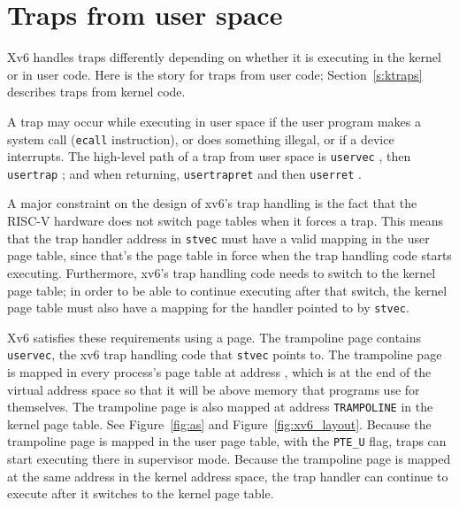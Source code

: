 \section{Traps from user space}

Xv6 handles traps differently depending on whether
it is executing in the kernel or in user code. Here is the
story for traps from user code; Section~\ref{s:ktraps}
describes traps from kernel code.

A trap may occur while executing in user space if the
user program makes a
system call ({\tt ecall} instruction), or does something
illegal, or if a device interrupts.
The high-level path of a trap from user space is
{\tt uservec}
,
then {\tt usertrap}
;
and when returning,
{\tt usertrapret}
and then
{\tt userret}
.


A major constraint on the design of xv6's trap handling is the fact
that the RISC-V hardware does not switch page tables when it forces a
trap. This means that the trap handler
address in {\tt stvec} must have a valid
mapping in the user page table, since that's the page table in force
when the trap handling code starts executing. Furthermore, xv6's trap
handling code needs to switch to the kernel page table; in order to be
able to continue executing after that switch, the kernel page table
must also have a mapping for the handler pointed to by {\tt stvec}.

Xv6 satisfies these requirements using a  page.
The trampoline page contains {\tt uservec}, the xv6 trap handling code
that {\tt stvec} points to. The trampoline page is mapped in
every process's page table at address
,
which is at the end of the virtual address space so that it will
be above memory that programs use for themselves.
The trampoline page is also mapped at address {\tt TRAMPOLINE}
in the kernel page table. See Figure~\ref{fig:as} and
Figure~\ref{fig:xv6_layout}. Because the trampoline page is mapped in
the user page table, with the {\tt PTE\_U} flag, traps can start
executing there in supervisor mode. Because the trampoline page is
mapped at the same address in the kernel address space, the trap handler
can continue to execute after it switches to the kernel page
table.

